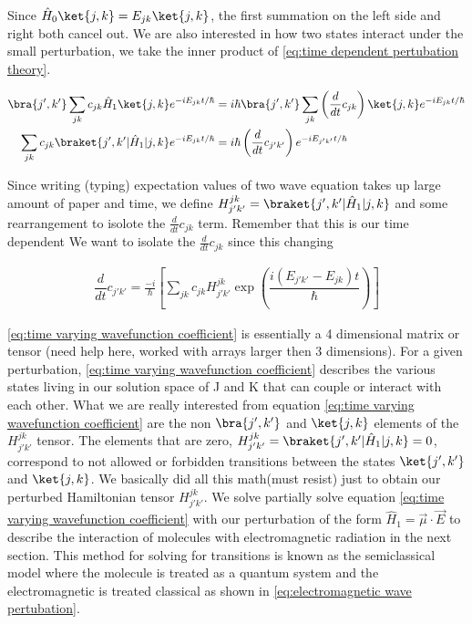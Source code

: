 \documentclass[11pt,a4paper]{book}
\begin{document}
			\noindent
			Since $\hat{H}_0\ket{j, k} = E_{jk}\ket{j,k}$, the first summation on the left side and right both cancel out. We are also interested in how two states interact under the small perturbation, we take the inner product of \autoref{eq:time dependent pertubation theory}.
			
			\begin{equation}
				\begin{split}
					\bra{j',k'}\sum_{jk} c_{jk} \hat{H}_1 \ket{j, k} e^{-i E_{j k} t/ \hbar}
					& =
					i\hbar \bra{j',k'}\sum_{jk} \left(\dfrac{d}{dt}{c}_{jk} \right) \ket{ j, k}e^{-i E_{jk} t/ \hbar} 
					\\
					\sum_{jk} c_{jk} \braket{j',k'|\hat{H}_1|j,k} e^{-i E_{j k} t/ \hbar} & = i\hbar \left(\dfrac{d}{dt}{c}_{j'k'} \right) e^{-i E_{j'k'} t/ \hbar}
				\end{split}
			\end{equation}
			
			Since writing (typing) expectation values of two wave equation takes up large amount of paper and time, we define $H_{j'k'}^{jk} = \braket{j',k'| \hat{H}_1 |j, k}$ and some rearrangement to isolote the $\frac{d}{dt}{c}_{jk}$ term. Remember that this is our time dependent We want to isolate the $\frac{d}{dt}{c}_{jk}$ since this changing 
			
			\begin{equation}
				\label{eq:time varying wavefunction coefficient} 
				\begin{split}
					\dfrac{d}{dt}{c}_{j'k'}
					=\frac{-i}{\hbar}
					\left[
					\sum_{jk} c_{jk} H_{j'k'}^{jk} \exp{
						\left
						(\dfrac{i(E_{j' k'} - E_{j k}) t} {\hbar}
						\right)} 
					\right]
				\end{split}
			\end{equation}
			
			\autoref{eq:time varying wavefunction coefficient} is essentially a 4 dimensional matrix or tensor (need help here, worked with arrays larger then 3 dimensions). For a given perturbation, \autoref{eq:time varying wavefunction coefficient} describes the various states living in our solution space of J and K that can couple or interact with each other. What we are really interested from equation \autoref{eq:time varying wavefunction coefficient} are the non $\bra{j',k'}$ and $\ket{j,k}$ elements of the $H_{j'k'}^{jk}$ tensor. The elements that are zero, $H_{j'k'}^{jk} = \braket{j',k'| \hat{H}_1 |j, k} = 0$, correspond to not allowed or forbidden transitions between the states $\ket{j',k'}$ and $\ket{j,k}$. We basically did all this math(must resist) just to obtain our perturbed Hamiltonian tensor $H_{j'k'}^{jk}$. We solve partially solve equation \autoref{eq:time varying wavefunction coefficient} with our perturbation of the form $\hat{H}_1 = \vec{\mu}\cdot \vec{E}$ to describe the interaction of molecules with electromagnetic radiation in the next section. This method for solving for transitions is known as the semiclassical model where the molecule is treated as a quantum system and the electromagnetic is treated classical as shown in \autoref{eq:electromagnetic wave pertubation}.
			
\end{document}
